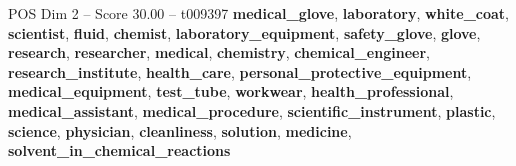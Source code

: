\begin{textsample}{POS Dim 2 – Score 30.00 – t009397}  \label{ex:f2_pos_011}
\textbf{medical\_glove}, \textbf{laboratory}, \textbf{white\_coat}, \textbf{scientist}, \textbf{fluid}, \textbf{chemist}, \textbf{laboratory\_equipment}, \textbf{safety\_glove}, \textbf{glove}, \textbf{research}, \textbf{researcher}, \textbf{medical}, \textbf{chemistry}, \textbf{chemical\_engineer}, \textbf{research\_institute}, \textbf{health\_care}, \textbf{personal\_protective\_equipment}, \textbf{medical\_equipment}, \textbf{test\_tube}, \textbf{workwear}, \textbf{health\_professional}, \textbf{medical\_assistant}, \textbf{medical\_procedure}, \textbf{scientific\_instrument}, \textbf{plastic}, \textbf{science}, \textbf{physician}, \textbf{cleanliness}, \textbf{solution}, \textbf{medicine}, \textbf{solvent\_in\_chemical\_reactions}

\end{textsample}
